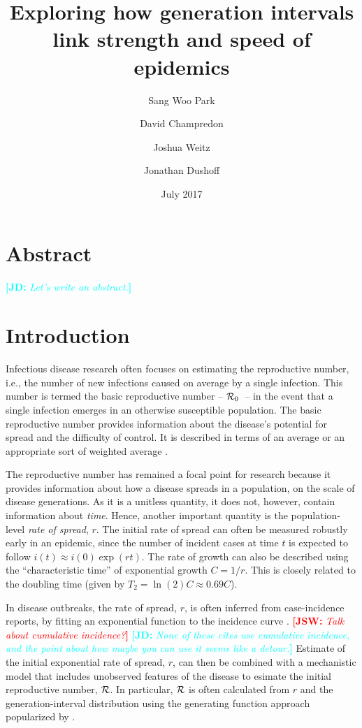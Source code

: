 \documentclass[12pt]{article}
\title{Exploring how generation intervals link strength and speed of epidemics}
\author{Sang Woo Park \and David Champredon \and Joshua Weitz \and Jonathan Dushoff}
\date{July 2017}
\newcommand{\RR}{\ensuremath{{\cal R}}}
\newcommand{\Rx}[1]{\ensuremath{{\cal R}_{#1}}}
\newcommand{\Ro}{\Rx{0}}
\newcommand{\Tc}{\ensuremath{C}}
\newcommand{\comment}[3]{\textcolor{#1}{\textbf{[#2: }\textit{#3}\textbf{]}}}
\newcommand{\jd}[1]{\comment{cyan}{JD}{#1}}
\newcommand{\jsw}[1]{\comment{red}{JSW}{#1}}
\begin{document}
\maketitle

\section*{Abstract}

\jd{Let's write an abstract.}

\section{Introduction}

Infectious disease research often focuses on estimating the reproductive number, i.e., the number of new infections caused on average by a single infection.
This number is termed the basic reproductive number -- \Ro\ -- in the event that a single infection emerges in an otherwise susceptible population.
The basic reproductive number provides information about the disease's potential for spread and the difficulty of control.
It is described in terms of an average \cite{AndeMay91} or an appropriate sort of weighted average \cite{DiekHees90}.

The reproductive number has remained a focal point for research because it provides information about how a disease spreads in a population, on the scale of disease generations.
As it is a unitless quantity, it does not, however, contain information about \emph{time}.
Hence, another important quantity is the population-level \emph{rate of spread}, $r$. The initial rate of spread can often be measured robustly early in an epidemic, since the number of incident cases at time $t$ is expected to follow $i(t) \approx i(0) \exp(r t)$. The rate of growth can also be described using the ``characteristic time'' of exponential growth $\Tc = 1/r$. This is closely related to the doubling time (given by $T_2 = \ln(2) \Tc \approx 0.69 \Tc$).

In disease outbreaks, the rate of spread, $r$, is often inferred from case-incidence reports, by fitting an exponential function to the incidence curve \cite{MillRobi04, NishCast09, MaJDush14}.
\jsw{Talk about cumulative incidence?}
\jd{None of these cites use cumulative incidence, and the point about how maybe you can use it seems like a detour.}
Estimate of the initial exponential rate of spread, $r$, can then be combined with a mechanistic model that includes unobserved features of the disease to esimate the initial reproductive number, \RR.
In particular, $\RR$ is often calculated from $r$ and the generation-interval distribution using the generating function approach popularized by \cite{WallLips07}.
\end{document}
